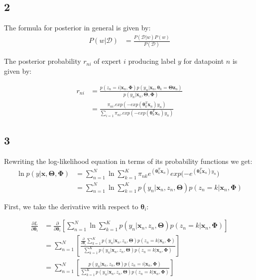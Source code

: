 \documentclass[a4paper]{article}
\begin{document}
\subsection*{2}
The formula for posterior in general is given by:
\begin{align*}
    P(w | \mathcal{D}) &= \frac{P(\mathcal{D} | w)P(w)}{P(\mathcal{D})} 
\end{align*}{}

The posterior probability $r_{ni}$ of expert $i$ producing label $y$ for datapoint $n$ is given by:

\begin{align*}
    r_{ni} &= \frac{p(z_{n}=i| \pmb{x}_{n}, \pmb{\Phi}) p(y_{n}|\pmb{x}_{n}, \pmb{\theta}_{k} = \pmb{\Theta z}_{n})}{p(y_{n}|\pmb{x}_{n}, \pmb{\Theta}, \pmb{\Phi})} \\
    &= \frac{\pi_{ni}.exp(-exp(\pmb{\theta}_{k}^{T} \pmb{x}_{n})y_{n})}{\sum_{i=1}\pi_{ni}.exp(-exp(\pmb{\theta}_{k}^{T} \pmb{x}_{n})y_{n})}
\end{align*}{}



\subsection*{3}
Rewriting the log-likelihood equation in terms of its probability functions we get:
\begin{align*}
    \ln{p(y|\pmb{x}, \pmb{\Theta}, \pmb{\Phi})} &= \sum_{n=1}^{N} \ln{\sum_{k=1}^{K} \pi_{nk} e^{(\pmb{\theta}_{k}^{T} \pmb{x}_{n})} exp(-e^{(\pmb{\theta}_{k}^{T} \pmb{x}_{n})y_{n}}}) \\
    &= \sum_{n=1}^{N} \ln{\sum_{k=1}^{K} p(y_{n}|\pmb{x}_{n},z_{n}, \pmb{\Theta}) p(z_{n}=k|\pmb{x}_{n}, \pmb{\Phi})}
\end{align*}{}


First, we take the derivative with respect to $\pmb{\theta}_{i}$:

\begin{align*}
    \frac{\partial L}{\partial \pmb{\theta}_{i}} &= \frac{\partial}{\partial \pmb{\theta}_{i}} \left[
    \sum_{n=1}^{N} \ln{\sum_{k=1}^{K} p(y_{n}|\pmb{x}_{n}, z_{n},\pmb{\Theta}) p(z_{n}=k|\pmb{x}_{n}, \pmb{\Phi})}
    \right] \\
    &= \sum_{n=1}^{N} \left[ \frac{\frac{\partial}{\partial \pmb{\theta}_{i}}\sum_{k=1}^{K} p(y_{n}|\pmb{x}_{n},z_{n}, \pmb{\Theta}) p(z_{n}=k|\pmb{x}_{n}, \pmb{\Phi})}
    {\sum_{k=1}^{K} p(y_{n}|\pmb{x}_{n},z_{n}, \pmb{\Theta}) p(z_{n}=k|\pmb{x}_{n}, \pmb{\Phi})}
    \right] \\
    &= \sum_{n=1}^{N} \left[ \frac{ p(y_{n}|\pmb{x}_{n}, z_{n}, \pmb{\Theta}) p(z_{n}=i|\pmb{x}_{n}, \pmb{\Phi})}
    {\sum_{k=1}^{K} p(y_{n}|\pmb{x}_{n}, z_{n}, \pmb{\Theta}) p(z_{n}=k|\pmb{x}_{n}, \pmb{\Phi})}
    \right]
\end{align*}{}
\end{document}
